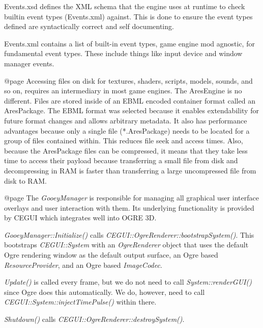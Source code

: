 Events.xsd defines the XML schema that the engine uses at runtime to check builtin event types (Events.xml) against. This is done to ensure the event types defined are syntactically correct and self documenting.

Events.xml contains a list of built-in event types, game engine mod agnostic, for fundamental event types. These include things like input device and window manager events.

    {}

@page 
Accessing files on disk for textures, shaders, scripts, models, sounds, and so on, requires an intermediary in most game engines. The AresEngine is no different. Files are stored inside of an EBML encoded container format called an AresPackage. The EBML format was selected because it enables extendability for future format changes and allows arbitrary metadata. It also has performance advantages because only a single file (*.AresPackage) needs to be located for a group of files contained within. This reduces file seek and access times. Also, because the AresPackage files can be compressed, it means that they take less time to access their payload because transferring a small file from disk and decompressing in RAM is faster than transferring a large uncompressed file from disk to RAM.

    {}

@page 
The {\sl GooeyManager} is responsible for managing all graphical user interface overlays and user interaction with them. Its underlying functionality is provided by CEGUI which integrates well into OGRE 3D.

{\sl GooeyManager::Initialize()} calls {\sl CEGUI::OgreRenderer::bootstrapSystem()}. This bootstraps {\sl CEGUI::System} with an {\sl OgreRenderer} object that uses the default Ogre rendering window as the default output surface, an Ogre based {\sl ResourceProvider}, and an Ogre based {\sl ImageCodec}.

{\sl Update()} is called every frame, but we do not need to call {\sl System::renderGUI()} since Ogre does this automatically. We do, however, need to call {\sl CEGUI::System::injectTimePulse()} within there.

{\sl Shutdown()} calls {\sl CEGUI::OgreRenderer::destroySystem()}.

